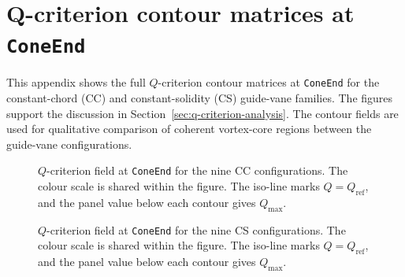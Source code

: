 \chapter{Q-criterion contour matrices at \texttt{ConeEnd}}
\label{app:qcrit-contours}
\fancyhead{}

This appendix shows the full \(Q\)-criterion contour matrices at \texttt{ConeEnd} for the constant-chord (CC) and constant-solidity (CS) guide-vane families. The figures support the discussion in Section~\ref{sec:q-criterion-analysis}. The contour fields are used for qualitative comparison of coherent vortex-core regions between the guide-vane configurations.

\begin{figure}[H]
\centering
{}
\caption{\(Q\)-criterion field at \texttt{ConeEnd} for the nine CC configurations. The colour scale is shared within the figure. The iso-line marks \(Q=Q_{\mathrm{ref}}\), and the panel value below each contour gives \(Q_{\max}\).}
\label{fig:app-qcrit-grid-cc}
\end{figure}

\begin{figure}[H]
\centering
{}
\caption{\(Q\)-criterion field at \texttt{ConeEnd} for the nine CS configurations. The colour scale is shared within the figure. The iso-line marks \(Q=Q_{\mathrm{ref}}\), and the panel value below each contour gives \(Q_{\max}\).}
\label{fig:app-qcrit-grid-cs}
\end{figure}

\FloatBarrier

\clearpage